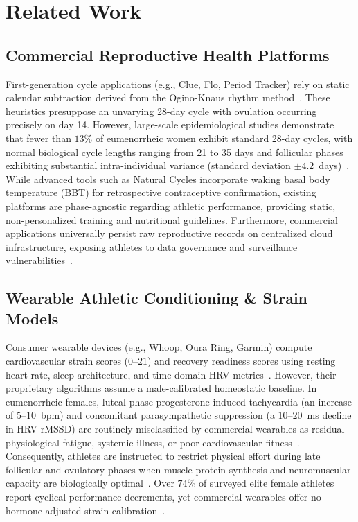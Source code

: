 \documentclass[conference]{IEEEtran}
\begin{document}
\section{Related Work}

\subsection{Commercial Reproductive Health Platforms}
First-generation cycle applications (e.g., Clue, Flo, Period Tracker) rely on static calendar subtraction derived from the Ogino-Knaus rhythm method~\cite{treloar1967}. These heuristics presuppose an unvarying 28-day cycle with ovulation occurring precisely on day 14. However, large-scale epidemiological studies demonstrate that fewer than $13\%$ of eumenorrheic women exhibit standard 28-day cycles, with normal biological cycle lengths ranging from 21 to 35 days and follicular phases exhibiting substantial intra-individual variance (standard deviation $\pm 4.2$~days)~\cite{bull2019}. While advanced tools such as Natural Cycles incorporate waking basal body temperature (BBT) for retrospective contraceptive confirmation, existing platforms are phase-agnostic regarding athletic performance, providing static, non-personalized training and nutritional guidelines. Furthermore, commercial applications universally persist raw reproductive records on centralized cloud infrastructure, exposing athletes to data governance and surveillance vulnerabilities~\cite{mozilla2023, flo2023}.

\subsection{Wearable Athletic Conditioning \& Strain Models}
Consumer wearable devices (e.g., Whoop, Oura Ring, Garmin) compute cardiovascular strain scores ($0$--$21$) and recovery readiness scores using resting heart rate, sleep architecture, and time-domain HRV metrics~\cite{whoop2023}. However, their proprietary algorithms assume a male-calibrated homeostatic baseline. In eumenorrheic females, luteal-phase progesterone-induced tachycardia (an increase of $5$--$10$~bpm) and concomitant parasympathetic suppression (a $10$--$20$~ms decline in HRV rMSSD) are routinely misclassified by commercial wearables as residual physiological fatigue, systemic illness, or poor cardiovascular fitness~\cite{bruinvels2022, bull2019}. Consequently, athletes are instructed to restrict physical effort during late follicular and ovulatory phases when muscle protein synthesis and neuromuscular capacity are biologically optimal~\cite{sims2021, mcnulty2020}. Over $74\%$ of surveyed elite female athletes report cyclical performance decrements, yet commercial wearables offer no hormone-adjusted strain calibration~\cite{mcnulty2020}.
\end{document}

